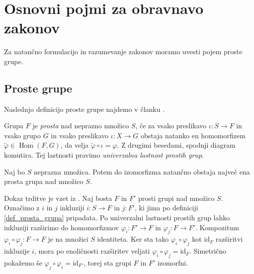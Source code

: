 \section{Osnovni pojmi za obravnavo zakonov}

Za natančno formulacijo in razumevanje zakonov moramo uvesti pojem proste grupe.

\subsection{Proste grupe}

Naslednjo definicijo proste grupe najdemo v članku \cite{Pogacnik_2024}.

\begin{definicija}
\label{def_prosta_grupa}
Grupa $F$ je \emph{prosta} nad neprazno množico $S$, če za vsako preslikavo $\iota : S \to F$ in vsako grupo $G$ in vsako preslikavo $\iota: X \to  G$ obstaja natanko en homomorfizem $\tilde{\varphi} \in \operatorname{Hom}(F, G)$,
da velja $\tilde{\varphi} \circ \iota = \varphi$. Z drugimi besedami, spodnji diagram komutira. Tej lastnosti pravimo \emph{univerzalna lastnost prostih grup}.
\end{definicija}


\begin{trditev}
\label{trd_enolicnost_prostih_grup}
 Naj bo $S$ neprazna množica. Potem do izomorfizma natančno obstaja največ ena prosta grupa nad množico $S$.
\end{trditev}
\begin{dokaz}
Dokaz trditve je vzet iz \cite[str.~4]{Pogacnik_2024}.
Naj bosta $F$ in $F'$ prosti grupi nad množico $S$. Označimo z $i$ in $j$ inkluziji $i : S \to F$ in $j : F'$, ki jima po definiciji \ref{def_prosta_grupa} pripadata. Po univerzalni lastnosti prostih grup lahko inkluziji
razširimo do homomorfizmov $\varphi_i : F' \to F$ in $\varphi_j : F \to F'$. %
Kompozitum $\varphi_i \circ \varphi_j : F \to F$ je na množici $S$ identiteta. Ker sta tako $\varphi_i \circ \varphi_j$ kot $\text{id}_F$ razširitvi inkluzije $i$,
mora po enoličnosti razširitev veljati $\varphi_i \circ \varphi_j = \text{id}_F$. Simetrično pokažemo še $\varphi_j \circ \varphi_i  = \text{id}_{F'}$, torej sta grupi $F$ in $F'$ izomorfni.
\end{dokaz}


